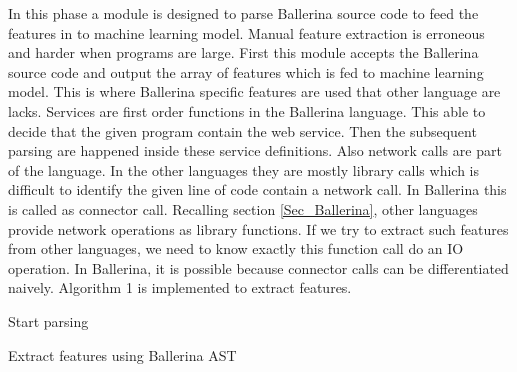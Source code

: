 In this phase a module is designed to parse Ballerina source code to feed the features in to machine learning model. Manual feature extraction is erroneous and harder when programs are large. First this module accepts the Ballerina source code and output the array of features which is fed to machine learning model. This is where Ballerina specific features are used that other language are lacks. 
Services are first order functions in the Ballerina language. This able to decide that the given program contain the web service. Then the subsequent parsing are happened inside these service definitions. Also network calls are part of the language. In the other languages they are mostly library calls which is difficult to identify the given line of code contain a network call. In Ballerina this is called as connector call. Recalling section \ref{Sec_Ballerina}, other languages provide network operations as library functions. If we try to extract such features from other languages, we need to know exactly this function call do an IO operation. In Ballerina, it is possible because connector calls can be differentiated naively. Algorithm 1 is implemented to extract features.

\begin{algorithm} \label{alg:ast_parser}
	
	\SetAlgoLined
	Start parsing\;
	
	
	\caption{Extract features using Ballerina AST}
\end{algorithm}


